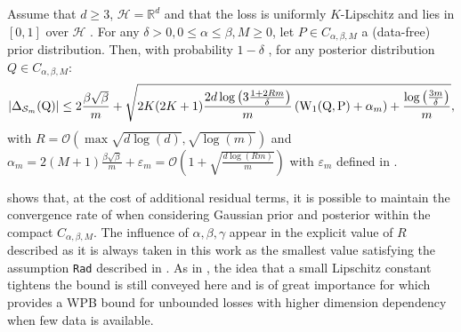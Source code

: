 \begin{theorem}
\label{th: main_gaussian_lpz}
Assume that $d\geq 3$, $\mathcal{H}= \mathbb{R}^d$ and that the loss is uniformly $K$-Lipschitz and lies in $[0,1]$ over $\mathcal{H}$ . For any $\delta>0, 0\leq \alpha\leq \beta, M\geq 0$, let $P\in C_{\alpha,\beta,M}$ a (data-free) prior distribution.
Then, with probability $1-\delta$ , for any posterior distribution $Q\in C_{\alpha,\beta,M}$:
\begin{align*}
|\Delta_{\mathcal{S}_m}(\mathrm{Q})|  \leq 2\frac{\beta{\sqrt{\beta}}}{m} + \sqrt{2K(2K+1)\frac{2d\log\left(3\frac{1 +2Rm }{\delta}\right)}{m} \left(\mathrm{W}_{1}(\mathrm{Q},\mathrm{P})+\alpha_m \right) + \frac{\log\left( \frac{3m}{\delta} \right)}{m}  },
\end{align*}
with $R=\mathcal{O}(\max \sqrt{d\log(d)},\sqrt{\log(m)})$ and $\alpha_m= 2(M+1)\frac{\beta\sqrt{\beta}}{m} + \varepsilon_m= \mathcal{O}\left(1 + \sqrt{\frac{d\log(Rm)}{m}}\right)$ with $\varepsilon_m$ defined in .
\end{theorem}
 shows that, at the cost of additional residual terms, it is possible to maintain the convergence rate of  when considering Gaussian prior and posterior within the compact $C_{\alpha,\beta,M}$. The influence of $\alpha,\beta,\gamma$ appear in the explicit value of $R$ described as it is always taken in this work as the smallest value satisfying the assumption \texttt{Rad} described in .
As in , the idea that a small Lipschitz constant tightens the bound is still conveyed here and is of great importance for  which provides a WPB bound for unbounded losses with higher dimension dependency when few data is available.

